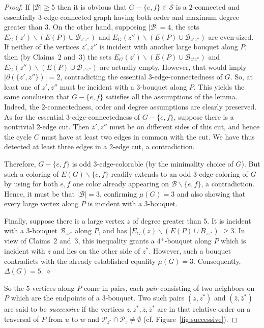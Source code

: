 \documentclass[a4paper,12pt]{article}
\numberwithin{equation}{section}
\begin{document}
\begin{proof}
 If $|\mathcal{B}|\geq5$ then it is obvious that $G-\{e,f\}\in\mathcal{S}$ is a $2$-connected and essentially $3$-edge-connected graph having both order and maximum degree greater than $3$. On the other hand, supposing $|\mathcal{B}|=4$, the sets $E_G(z')\backslash(E(P)\cup \mathcal{B}_{z'z''})$ and $E_G(z'')\backslash(E(P)\cup \mathcal{B}_{z'z''})$ are even-sized. If neither of the vertices $z',z''$ is incident with another large bouquet along $P$, then (by Claims~2 and~3) the sets $E_G(z')\backslash(E(P)\cup \mathcal{B}_{z'z''})$ and $E_G(z'')\backslash(E(P)\cup \mathcal{B}_{z'z''})$ are actually empty. However, that would imply  $|\partial(\{z',z''\})|=2$, contradicting the essential $3$-edge-connectedness of $G$. So, at least one of $z',z''$ must be incident with a $3$-bouquet along $P$. This yields the same conclusion that $G-\{e,f\}$ satisfies all the assumptions of the lemma. Indeed, the $2$-connectedness, order and degree assumptions are clearly preserved. As for the essential $3$-edge-connectedness of $G-\{e,f\}$, suppose there is a nontrivial $2$-edge cut. Then $z',z''$ must be on different sides of this cut, and hence the cycle $C$ must have at least two edges in common with the cut. We have thus detected at least three edges in a $2$-edge cut, a contradiction.

  Therefore, $G-\{e,f\}$ is odd $3$-edge-colorable (by the minimality choice of $G$). But such a coloring of $E(G)\backslash\{e,f\}$ readily extends to an odd $3$-edge-coloring of $G$ by using for both $e,f$ one color already appearing on $\mathcal{B}\backslash\{e,f\}$, a contradiction. Hence, it must be that $|\mathcal{B}|=3$, confirming $\mu(G)=3$ and also showing that every large vertex along $P$ is incident with a $3$-bouquet.

Finally, suppose there is a large vertex $z$ of degree greater than $5$. It is incident with a $3$-bouquet $\mathcal{B}_{zz^*}$ along $P$, and has $|E_G(z)\backslash(E(P)\cup B_{zz^*})|\geq3$. In view of Claims~2 and~3, this inequality grants a $4^+$-bouquet along $P$ which is incident with $z$ and lies on the other side of $z^*$. However, such a bouquet contradicts with the already established equality $\mu(G)=3$. Consequently, $\Delta(G)=5$.
\hfill$\diamond$

\bigskip

So the $5$-vertices along $P$ come in pairs, each \textit{pair} consisting of two neighbors on $P$ which are the endpoints of a $3$-bouquet. Two such pairs $(z,z^*)$ and $(\bar{z},\bar{z}^*)$ are said to be \textit{successive} if the vertices $z,z^*,\bar{z},\bar{z}^*$ are in that relative order on a traversal of $P$ from $u$ to $w$ and $\mathcal{P}_{z^*}\cap\mathcal{P}_{\bar{z}}\neq\emptyset$ (cf. Figure~\ref{fig:successive}).


\end{proof}
\end{document}
